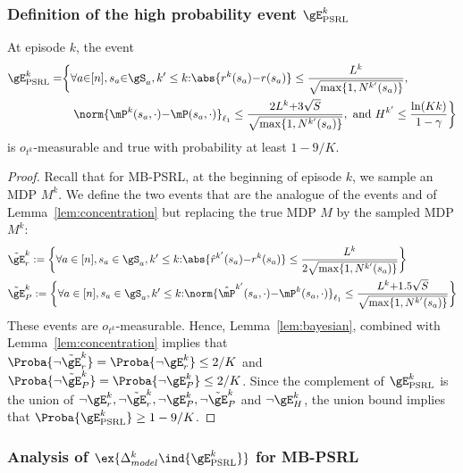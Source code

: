 \begin{subappendices}
\subsubsection{Definition of the high probability event \texorpdfstring{$\gE_\text{PSRL}^{k}$}{}}
\begin{lem}
    \label{lem:concentration_psrl}
    At episode $k$, the event
    \begin{align*}
        \gE_\textnormal{PSRL}^{k} =
        &\bigg\{ \forall a{\in}[n], s_a{\in}\gS_a, k'\le k{:}
            \abs{r^{k}(s_a){-}r(s_a)} \le\frac{L^{k}}{\sqrt{\max\{1,N^{k'}(s_a)\} }}, \\
        &\quad\norm{\mP^{k}(s_a,\cdot) {-}\mP(s_a,\cdot)}_{\ell_1} \le\frac{2L^{k}{+}3\sqrt{S}}{\sqrt{\max\{1,N^{k'}(s_a)\} }}, \text{ and } H^{k'}\le \frac{\ln(Kk)}{1-\gamma} \bigg\}
    \end{align*}
    is $o_{t^k}$-measurable and true with probability at least $1-9/K$.
\end{lem}

\begin{proof}
    Recall that for MB-PSRL, at the beginning of episode $k$, we sample an MDP $M^{k}$. We define the two events that are the analogue of the events  and  of Lemma~\ref{lem:concentration} but replacing the true MDP $M$ by the sampled MDP $M^{k}$: 
    \begin{align*}
        &\tilde{\gE}^{k}_r:= \bigg\{\forall a\in[n], s_a\in\gS_a, k'\le k{:} \abs{\hat{r}^{k'}(s_a){-}r^{k}(s_a)} \le \frac{L^{k}}{2\sqrt{\max\{1,N^{k'}(s_a)\} }}\bigg\} \\
        &\tilde{\gE}^{k}_P:= \bigg\{\forall a\in[n], s_a\in\gS_a, k'\le k{:} \norm{\hat{\mP}^{k'}(s_a,\cdot){-}\mP^{k}(s_a, \cdot)}_{\ell_1} \le \frac{L^{k}{+}1.5\sqrt{S}}{\sqrt{\max\{1,N^{k'}(s_a)\} }}\bigg\} 
    \end{align*}
    These events are $o_{t^k}$-measurable. Hence, Lemma~\ref{lem:bayesian}, combined with Lemma~\ref{lem:concentration} implies that $\Proba{ \lnot \tilde{\gE}^{k}_r} =\Proba{ \lnot \gE^{k}_r}\le 2/K$ and $\Proba{\lnot \tilde{\gE}^{k}_P}=\Proba{ \lnot \gE^{k}_P}\le 2/K$. Since the complement of $\gE^{k}_\text{PSRL}$ is the union of $\lnot \gE^{k}_r, \lnot \tilde{\gE}^{k}_r, \lnot \gE^{k}_P, \lnot \tilde{\gE}^{k}_P$ and $\lnot \gE^{k}_H$, the union bound implies that $\Proba{\gE_\text{PSRL}^{k}}\ge1-9/K$.
\end{proof}
\subsubsection{Analysis of $\ex{\Delta_{model}^k \ind{\gE^{k}_\text{PSRL}}}$ for MB-PSRL}


\end{subappendices}
